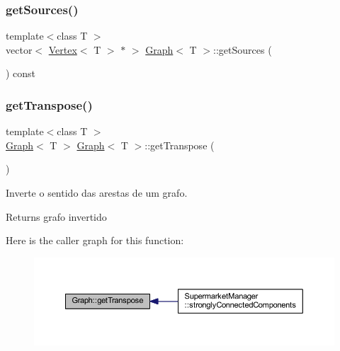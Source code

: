 \subsubsection{\texorpdfstring{get\+Sources()}{getSources()}}
{\footnotesize\ttfamily template$<$class T $>$ \\
vector$<$ \hyperlink{class_vertex}{Vertex}$<$ T $>$ $\ast$ $>$ \hyperlink{class_graph}{Graph}$<$ T $>$\+::get\+Sources (\begin{DoxyParamCaption}{ }\end{DoxyParamCaption}) const}

\mbox{\label{class_graph_a153095b4dd52f90027f8a7ac3fc5d2ab}} 
\subsubsection{\texorpdfstring{get\+Transpose()}{getTranspose()}}
{\footnotesize\ttfamily template$<$class T $>$ \\
\hyperlink{class_graph}{Graph}$<$ T $>$ \hyperlink{class_graph}{Graph}$<$ T $>$\+::get\+Transpose (\begin{DoxyParamCaption}{ }\end{DoxyParamCaption})}

Inverte o sentido das arestas de um grafo.

\begin{DoxyReturn}{Returns}
grafo invertido 
\end{DoxyReturn}
Here is the caller graph for this function\+:
\nopagebreak
\begin{figure}[H]
\begin{center}
\leavevmode
\includegraphics[width=350pt]{class_graph_a153095b4dd52f90027f8a7ac3fc5d2ab_icgraph}
\end{center}
\end{figure}
\mbox{\label{class_graph_a67453d232f04e85c642b51554df1bc6a}} 
